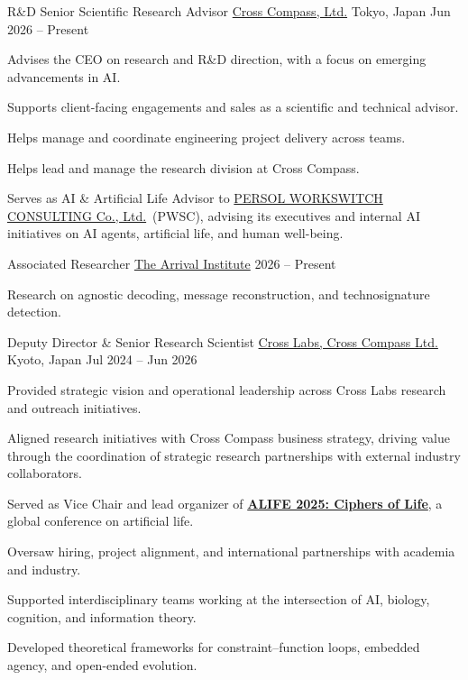 

\begin{cventries}

\cventry
  {R\&D Senior Scientific Research Advisor}
  {\href{https://www.cross-compass.com/}{Cross Compass, Ltd.}}
  {Tokyo, Japan}
  {Jun 2026 -- Present}
  {
    \begin{cvitems}
      \item {Advises the CEO on research and R\&D direction, with a focus on emerging advancements in AI.}
      \item {Supports client-facing engagements and sales as a scientific and technical advisor.}
      \item {Helps manage and coordinate engineering project delivery across teams.}
      \item {Helps lead and manage the research division at Cross Compass.}
      \item {Serves as AI \& Artificial Life Advisor to \href{https://www.persol-wsc.co.jp/}{PERSOL WORKSWITCH CONSULTING Co., Ltd.}\ (PWSC), advising its executives and internal AI initiatives on AI agents, artificial life, and human well-being.}
    \end{cvitems}
  }

\cventry
  {Associated Researcher}
  {\href{https://arrivalinstitute.com/researchers}{The Arrival Institute}}
  {}
  {2026 -- Present}
  {
    \begin{cvitems}
      \item {Research on agnostic decoding, message reconstruction, and technosignature detection.}
    \end{cvitems}
  }

\cventry
  {Deputy Director \& Senior Research Scientist}
  {\href{https://www.crosslabs.org/}{Cross Labs, Cross Compass Ltd.}}
  {Kyoto, Japan}
  {Jul 2024 -- Jun 2026}
  {
    \begin{cvitems}
      \item {Provided strategic vision and operational leadership across Cross Labs research and outreach initiatives.}
      \item {Aligned research initiatives with Cross Compass business strategy, driving value through the coordination of strategic research partnerships with external industry collaborators.}
      \item {Served as Vice Chair and lead organizer of \href{https://2025.alife.org}{\textbf{ALIFE 2025: Ciphers of Life}}, a global conference on artificial life.}
      \item {Oversaw hiring, project alignment, and international partnerships with academia and industry.}
      \item {Supported interdisciplinary teams working at the intersection of AI, biology, cognition, and information theory.}
      \item {Developed theoretical frameworks for constraint–function loops, embedded agency, and open-ended evolution.}
    \end{cvitems}
  }


\end{cventries}
